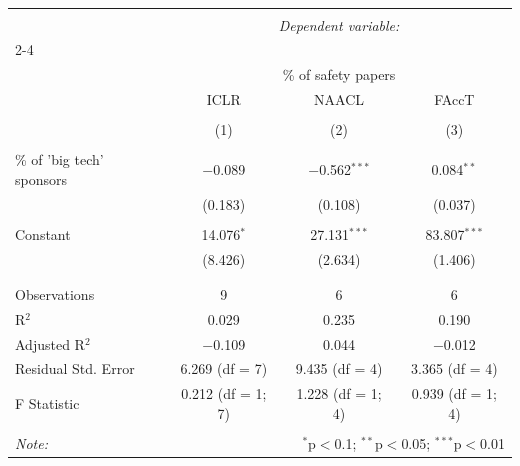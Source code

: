 \begin{table}[!htbp] \centering 
  \caption{} 
  \label{} 
\begin{tabular}{@{\extracolsep{5pt}}lccc} 
\\[-1.8ex]\hline 
\hline \\[-1.8ex] 
 & \multicolumn{3}{c}{\textit{Dependent variable:}} \\ 
\cline{2-4} 
\\[-1.8ex] & \multicolumn{3}{c}{\% of safety papers} \\ 
 & ICLR & NAACL & FAccT \\ 
\\[-1.8ex] & (1) & (2) & (3)\\ 
\hline \\[-1.8ex] 
 \% of 'big tech' sponsors & $-$0.089 & $-$0.562$^{***}$ & 0.084$^{**}$ \\ 
  & (0.183) & (0.108) & (0.037) \\ 
  & & & \\ 
 Constant & 14.076$^{*}$ & 27.131$^{***}$ & 83.807$^{***}$ \\ 
  & (8.426) & (2.634) & (1.406) \\ 
  & & & \\ 
\hline \\[-1.8ex] 
Observations & 9 & 6 & 6 \\ 
R$^{2}$ & 0.029 & 0.235 & 0.190 \\ 
Adjusted R$^{2}$ & $-$0.109 & 0.044 & $-$0.012 \\ 
Residual Std. Error & 6.269 (df = 7) & 9.435 (df = 4) & 3.365 (df = 4) \\ 
F Statistic & 0.212 (df = 1; 7) & 1.228 (df = 1; 4) & 0.939 (df = 1; 4) \\ 
\hline 
\hline \\[-1.8ex] 
\textit{Note:}  & \multicolumn{3}{r}{$^{*}$p$<$0.1; $^{**}$p$<$0.05; $^{***}$p$<$0.01} \\ 
\end{tabular} 
\end{table} 

